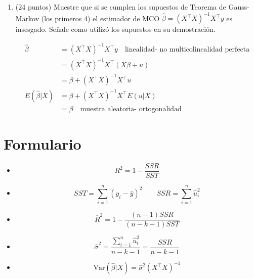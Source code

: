 \documentclass[10pt,a4paper]{article}
\begin{document}
\begin{enumerate}
\begin{enumerate}
¿tiene sentido mantener constantes sleep, work y leisure, y variar study?

{\color{blue} No, tiene sentido porque no se pueden mantener constantes los tiempos dedicados a todas las otras actividades y modificar study. Dado que las 4 actividades representan el 100\% del tiempo de los individuos.}
\item (12 puntos) Explique por qué este modelo viola el supuesto de NO multicolinealidad perfecta (supuesto de identificación).

{\color{blue}Viola el supuesto porque los vectores de regresores sleep, work, leisure y  study son linealmente dependientes. Dado que para cada observación se cumple que:

$$sleep + work + leisure=168- study$$}
\end{enumerate}

\item (24 puntos) Muestre que si se cumplen los supuestos de Teorema de Gauss-Markov (los primeros 4) el estimador de MCO $ \hat{\beta} = (X^{\top}X)^{-1}X^{\top}y$
es insesgado. Señale como utilizó los supuestos en su demostración.

{\color{blue} \begin{align*}
        \hat{\beta} &= (X^{\top}X)^{-1}X^{\top}y \quad \text{linealidad- no multicolinealidad perfecta} \\
        &= (X^{\top}X)^{-1}X^{\top}(X\beta + u) \quad \text{} \\
        &= \beta + (X^{\top}X)^{-1}X^{\top}u \quad  \\
        E(\hat{\beta}|X) &= \beta + (X^{\top}X)^{-1}X^{\top}E(u|X) \quad  \\
        &= \beta \quad \text{muestra aleatoria- ortogonalidad}
    \end{align*}}


\end{enumerate}

\section{Formulario}


\begin{itemize}
    \item \[ R^2  = 1 - \frac{SSR}{SST} \] 
\item  $$SST = \sum_{i=1}^{n} (y_i - \bar{y})^2 \quad \quad SSR = \sum_{i=1}^{n}  \hat{u}_i^2 $$
    \item \[ \bar{R}^2 =  1 - \frac{(n-1)SSR}{(n-k-1)SST} \]

    \item  $$\hat{\sigma}^2 = \frac{\sum_{i=1}^{n} \hat{u}_i^2 }{n-k-1}= \frac{SSR}{n - k - 1}$$
    \item \[
\text{Var}(\hat{\beta}|X) = \hat{\sigma}^2(X^{\top}X)^{-1}
\]
    \end{itemize}

    
\end{document}
